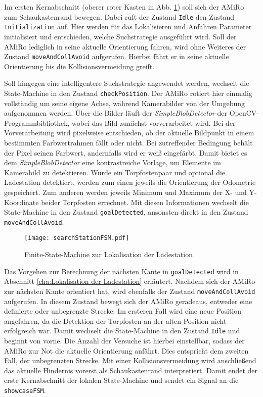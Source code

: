 Im ersten Kernabschnitt (oberer roter Kasten in Abb. \ref{fig:searchStationFSM}) soll sich der AMiRo zum Schaukastenrand bewegen. Dabei ruft der Zustand \texttt{Idle} den Zustand \texttt{Initialization} auf. Hier werden für das Lokalisieren und Anfahren Parameter initialisiert und entschieden, welche Suchstrategie ausgeführt wird. Soll der AMiRo lediglich in seine aktuelle Orientierung fahren, wird ohne Weiteres der Zustand \texttt{moveAndCollAvoid} aufgerufen. Hierbei fährt er in seine aktuelle Orientierung bis die Kollisionsvermeidung greift. 

Soll hingegen eine intelligentere Suchstrategie angewendet werden, wechselt die State-Machine in den Zustand \texttt{checkPosition}. Der AMiRo rotiert hier einmalig vollständig um seine eigene Achse, während Kamerabilder von der Umgebung aufgenommen werden. Über die Bilder läuft der \textit{SimpleBlobDetector} der OpenCV-Programmbibliothek, wobei das Bild zunächst vorverarbeitet wird. Bei der Vorverarbeitung wird pixelweise entschieden, ob der aktuelle Bildpunkt in einem bestimmten Farbwertrahmen fällt oder nicht. Bei zutreffender Bedingung behält der Pixel seinen Farbwert, andernfalls wird er weiß eingefärbt. Damit bietet es dem \textit{SimpleBlobDetector} eine kontrastreiche Vorlage, um Elemente im Kamerabild zu detektieren. Wurde ein Torpfostenpaar und optional die Ladestation detektiert, werden zum einen jeweils die Orientierung der Odometrie gespeichert. Zum anderen werden jeweils Minimum und Maximum der X- und Y-Koordinate beider Torpfosten errechnet. Mit diesen Informationen wechselt die State-Machine in den Zustand \texttt{goalDetected}, ansonsten direkt in den Zustand \texttt{moveAndCollAvoid}.

\begin{figure}[H]
	\begin{center}
		\texttt{[image: searchStationFSM.pdf]} 	
		\caption{Finite-State-Machine zur Lokalisation der Ladestation}
		\label{fig:searchStationFSM}
	\end{center}
\end{figure}

Das Vorgehen zur Berechnung der nächsten Kante in \texttt{goalDetected} wird in Abschnitt \ref{cha:Lokalisation der Ladestation} erläutert. Nachdem sich der AMiRo zur nächsten Kante orientiert hat, wird ebenfalls der Zustand \texttt{moveAndCollAvoid} aufgerufen. In diesem Zustand bewegt sich der AMiRo geradeaus, entweder eine definierte oder unbegrenzte Strecke. Im ersteren Fall wird eine neue Position angefahren, da die Detektion der Torpfosten an der alten Position nicht erfolgreich war. Damit wechselt die State-Machine in den Zustand \texttt{Idle} und beginnt von vorne. Die Anzahl der Versuche ist hierbei einstellbar, sodass der AMiRo zur Not die aktuelle Orientierung anfährt. Dies entspricht dem zweiten Fall, der unbegrenzten Strecke. Mit einer Kollisionsvermeidung wird anschließend das aktuelle Hindernis vorerst als Schaukastenrand interpretiert. Damit endet der erste Kernabschnitt der lokalen State-Machine und sendet ein Signal an die \texttt{showcaseFSM}.

